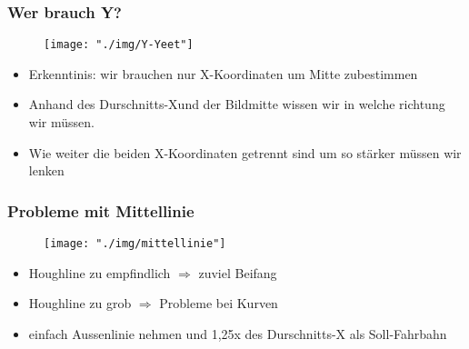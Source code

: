 \documentclass{beamer}
\begin{document}
\begin{frame}

\frametitle{Wer brauch Y?}

\begin{center}
\begin{figure}[h]
\centering
\texttt{[image: "./img/Y-Yeet"]}

\label{fig:Weg mit dem Y}
\end{figure}
\end{center}

\begin{itemize}
\item Erkenntinis: wir brauchen nur X-Koordinaten um Mitte zubestimmen
\item Anhand des \glqq Durschnitts-X\grqq  und der Bildmitte wissen wir in welche richtung wir müssen. 
\item Wie weiter die beiden X-Koordinaten getrennt sind um so stärker müssen wir lenken 
\end{itemize}

\end{frame}

\begin{frame}

\frametitle{Probleme mit Mittellinie}

\begin{center}
\begin{figure}[h]
\centering
\texttt{[image: "./img/mittellinie"]}
\label{fig:Mittellinie}
\end{figure}
\end{center}

\begin{itemize}
\item Houghline zu empfindlich $\Rightarrow$ zuviel \glqq Beifang\grqq 
\item Houghline zu grob $\Rightarrow$ Probleme bei Kurven
\item einfach Aussenlinie nehmen und 1,25x des Durschnitts-X als Soll-Fahrbahn
\end{itemize}

\end{frame}
\end{document}

